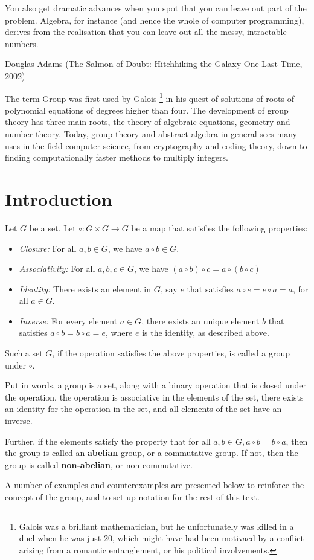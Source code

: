 \epigraph{You also get dramatic advances when you spot that you can leave out part of the problem. Algebra, for instance (and hence the whole of computer programming), derives from the realisation that you can leave out all the messy, intractable numbers.}{Douglas Adams (The Salmon of Doubt: Hitchhiking the Galaxy One Last Time, 2002)}
\par
The term Group was first used by Galois \footnote{Galois was a brilliant mathematician, but he unfortunately was killed in a duel when he was just 20, which might have had been motivaed by a conflict arising from a romantic entanglement, or his political involvements.} in his quest of solutions of roots of polynomial equations of degrees higher than four.
The development of group theory has three main roots, the theory of algebraic equations, geometry and number theory.
Today, group theory and abstract algebra in general sees many uses in the field computer science, from cryptography and coding theory, down to finding computationally faster methods to multiply integers.
\section{Introduction}
\begin{definition} \label{def:group}
  Let $G$ be a set.
  Let $ \circ : G \times G \rightarrow G $  be a map that satisfies the following properties:
  \begin{itemize}
    \item \textit{Closure:} For all $a, b \in G$, we have $a \circ b \in G$.
    \item \textit{Associativity:} For all $a, b, c \in G$, we have $(a \circ b) \circ c = a \circ (b \circ c)$
    \item \textit{Identity:} There exists an element in $G$, say $e$ that satisfies $a \circ e = e \circ a = a$, for all $a \in G$.
    \item \textit{Inverse:} For every element $a \in G$, there exists an unique element $b$ that satisfies $a \circ b = b \circ a = e$, where $e$ is the identity, as described above.
  \end{itemize}
  Such a set $G$, if the operation satisfies the above properties, is called a group under $\circ$.
\end{definition}
Put in words, a group is a set, along with a binary operation that is closed under the operation, the operation is associative in the elements of the set, there exists an identity for the operation in the set, and all elements of the set have an inverse.
\par
Further, if the elements satisfy the property that for all $a, b \in G, a \circ b = b \circ a$, then the group is called an \textbf{abelian} group, or a commutative group.
If not, then the group is called \textbf{non-abelian}, or non commutative.
\par
A number of examples and counterexamples are presented below to reinforce the concept of the group, and to set up notation for the rest of this text.
